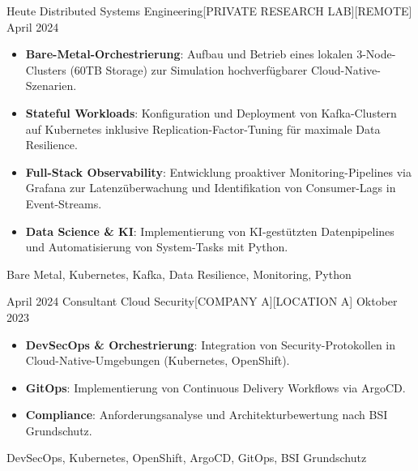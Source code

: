 %
%
%
\begin{experiences}  

\experience
    {Heute}   {Distributed Systems Engineering}{[PRIVATE RESEARCH LAB]}{[REMOTE]}
    {April 2024} {
                      \begin{itemize}
                        \item \textbf{Bare-Metal-Orchestrierung}: Aufbau und Betrieb eines lokalen 3-Node-Clusters (60TB Storage) zur Simulation hochverfügbarer Cloud-Native-Szenarien.
                        \item \textbf{Stateful Workloads}: Konfiguration und Deployment von Kafka-Clustern auf Kubernetes inklusive Replication-Factor-Tuning für maximale Data Resilience.
                        \item \textbf{Full-Stack Observability}: Entwicklung proaktiver Monitoring-Pipelines via Grafana zur Latenzüberwachung und Identifikation von Consumer-Lags in Event-Streams.
                        \item \textbf{Data Science \& KI}: Implementierung von KI-gestützten Datenpipelines und Automatisierung von System-Tasks mit Python.
                      \end{itemize}
                    }
                    {Bare Metal, Kubernetes, Kafka, Data Resilience, Monitoring, Python}

\emptySeparator 

\experience
    {April 2024}   {Consultant Cloud Security}{[COMPANY A]}{[LOCATION A]}
    {Oktober 2023} {
                      \begin{itemize}
                        \item \textbf{DevSecOps \& Orchestrierung}: Integration von Security-Protokollen in Cloud-Native-Umgebungen (Kubernetes, OpenShift).
                        \item \textbf{GitOps}: Implementierung von Continuous Delivery Workflows via ArgoCD.
                        \item \textbf{Compliance}: Anforderungsanalyse und Architekturbewertung nach BSI Grundschutz.
                      \end{itemize}
                    }
                    {DevSecOps, Kubernetes, OpenShift, ArgoCD, GitOps, BSI Grundschutz}


\end{experiences}
